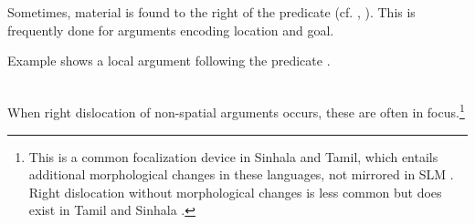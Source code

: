 Sometimes, material is found to the right of the predicate (cf. \citet[137ff.]{Slomanson2006cll}, \citet[14]{Ansaldo2005ms}). This is frequently done for arguments encoding location and goal.




Example  shows a local argument following the predicate .

 


 \\


When right dislocation of non-spatial arguments occurs, these are often in focus.\footnote{This is a  common focalization device in Sinhala and Tamil, which entails additional morphological changes in these languages, not mirrored in SLM \citep{Gair1985calque}. Right dislocation without morphological changes is less common but does exist in Tamil \citep{Herring1994} and Sinhala \citep{Paolillo1997}.}

